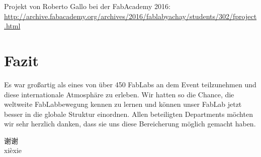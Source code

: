 \documentclass{\basedir/fablab-document}
\begin{document}
Projekt von Roberto Gallo bei der FabAcademy 2016:\\ \url{http://archive.fabacademy.org/archives/2016/fablabyachay/students/302/fproject.html}

\section*{Fazit}\label{fazit}

Es war großartig als eines von über 450 FabLabs an dem
Event teilzunehmen und diese internationale Atmosphäre zu erleben. Wir
hatten so die Chance, die weltweite FabLabbewegung kennen zu lernen und
können unser FabLab jetzt besser in die globale Struktur einordnen.
Allen beteiligten Departments möchten wir sehr herzlich danken, dass sie
uns diese Bereicherung möglich gemacht haben.

\vspace{1cm}
\LARGE
\centering
\begin{CJK}{UTF8}{gbsn}
	谢谢\\
	xi\`exie
\end{CJK}
	
\end{document}
